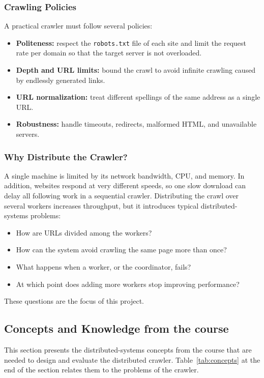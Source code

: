 \subsubsection{Crawling Policies}
A practical crawler must follow several policies:
\begin{itemize}
    \item \textbf{Politeness:} respect the \texttt{robots.txt} file of each site and limit the request rate per domain so that the target server is not overloaded.
    \item \textbf{Depth and URL limits:} bound the crawl to avoid infinite crawling caused by endlessly generated links.
    \item \textbf{URL normalization:} treat different spellings of the same address as a single URL.
    \item \textbf{Robustness:} handle timeouts, redirects, malformed HTML, and unavailable servers.
\end{itemize}


\subsubsection{Why Distribute the Crawler?}
A single machine is limited by its network bandwidth, CPU, and memory. In addition, websites respond at very different speeds, so one slow download can delay all following work in a sequential crawler. Distributing the crawl over several workers increases throughput, but it introduces typical distributed-systems problems:
\begin{itemize}
    \item How are URLs divided among the workers?
    \item How can the system avoid crawling the same page more than once?
    \item What happens when a worker, or the coordinator, fails?
    \item At which point does adding more workers stop improving performance?
\end{itemize}
These questions are the focus of this project.




\subsection{Concepts and Knowledge from the course}

This section presents the distributed-systems concepts from the course that are needed to design and evaluate the distributed crawler. Table~\ref{tab:concepts} at the end of the section relates them to the problems of the crawler.


